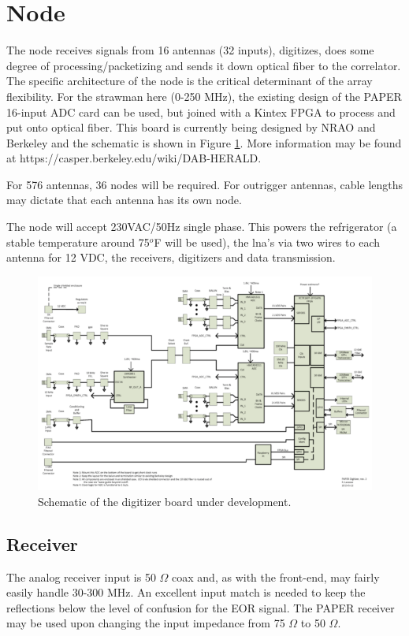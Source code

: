\documentclass[11pt]{article}
\begin{document}
\section{Node}

The node receives signals from 16 antennas (32 inputs), digitizes, does some degree of processing/packetizing and sends it down optical fiber to the correlator.  The specific architecture of the node is the critical determinant of the array flexibility.  For the strawman here (0-250 MHz), the existing design of the PAPER 16-input ADC card can be used, but joined with a Kintex FPGA to process and put onto optical fiber.   This board is currently being designed by NRAO and Berkeley and the schematic is shown in Figure \ref{fig:herald}.  More information may be found at https://casper.berkeley.edu/wiki/DAB-HERALD.

For 576 antennas, 36 nodes will be required.  For outrigger antennas, cable lengths may dictate that each
antenna has its own node.

The node will accept 230VAC/50Hz single phase.  This powers the refrigerator (a stable temperature around 75$^o$F will be used), the lna's via two wires to each antenna for 12 VDC, the receivers, digitizers and data transmission.

\begin{figure}[H]
\centering
\includegraphics[width=\textwidth]{plots/herald.png}
\caption{Schematic of the digitizer board under development.}
\label{fig:herald}
\end{figure}

\subsection{Receiver}
The analog receiver input is 50 $\Omega$ coax and, as with the front-end, may fairly easily handle 30-300 MHz.  An excellent input match is needed to keep the reflections below the level of confusion for the EOR signal.  The PAPER receiver may be used upon changing the input impedance from 75 $\Omega$ to 50 $\Omega$.
\end{document}
